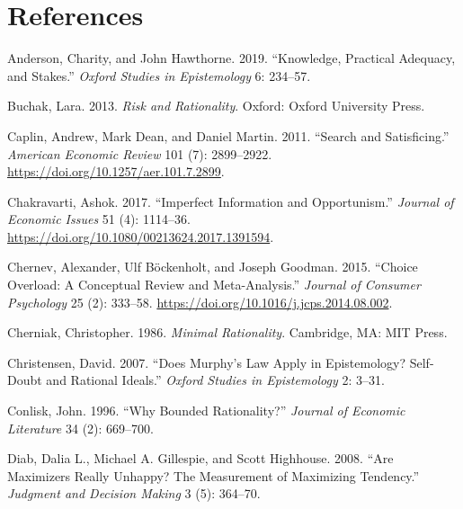 \documentclass[
  12pt,
]{article}
\newlength{\cslhangindent}
\newlength{\cslentryspacingunit} %
\newenvironment{CSLReferences}[2] %
 {%
  \setlength{\parindent}{0pt}
  \ifodd #1
  \let\oldpar\par
  \def\par{\hangindent=\cslhangindent\oldpar}
  \fi
  \setlength{\parskip}{#2\cslentryspacingunit}
 }%
 {}
\begin{document}
\hypertarget{references}{%
\section*{References}\label{references}}

\hypertarget{refs}{}
\begin{CSLReferences}{1}{0}
\leavevmode{}%
Anderson, Charity, and John Hawthorne. 2019. {``Knowledge, Practical Adequacy, and Stakes.''} \emph{Oxford Studies in Epistemology} 6: 234--57.

\leavevmode{}%
Buchak, Lara. 2013. \emph{Risk and Rationality}. Oxford: Oxford University Press.

\leavevmode{}%
Caplin, Andrew, Mark Dean, and Daniel Martin. 2011. {``Search and Satisficing.''} \emph{American Economic Review} 101 (7): 2899--2922. \url{https://doi.org/10.1257/aer.101.7.2899}.

\leavevmode{}%
Chakravarti, Ashok. 2017. {``Imperfect Information and Opportunism.''} \emph{Journal of Economic Issues} 51 (4): 1114--36. \url{https://doi.org/10.1080/00213624.2017.1391594}.

\leavevmode{}%
Chernev, Alexander, Ulf Böckenholt, and Joseph Goodman. 2015. {``Choice Overload: A Conceptual Review and Meta-Analysis.''} \emph{Journal of Consumer Psychology} 25 (2): 333--58. \url{https://doi.org/10.1016/j.jcps.2014.08.002}.

\leavevmode{}%
Cherniak, Christopher. 1986. \emph{Minimal Rationality}. Cambridge, MA: MIT Press.

\leavevmode{}%
Christensen, David. 2007. {``Does Murphy's Law Apply in Epistemology? Self-Doubt and Rational Ideals.''} \emph{Oxford Studies in Epistemology} 2: 3--31.

\leavevmode{}%
Conlisk, John. 1996. {``Why Bounded Rationality?''} \emph{Journal of Economic Literature} 34 (2): 669--700.

\leavevmode{}%
Diab, Dalia L., Michael A. Gillespie, and Scott Highhouse. 2008. {``Are Maximizers Really Unhappy? The Measurement of Maximizing Tendency.''} \emph{Judgment and Decision Making} 3 (5): 364--70.


\end{CSLReferences}
\end{document}
